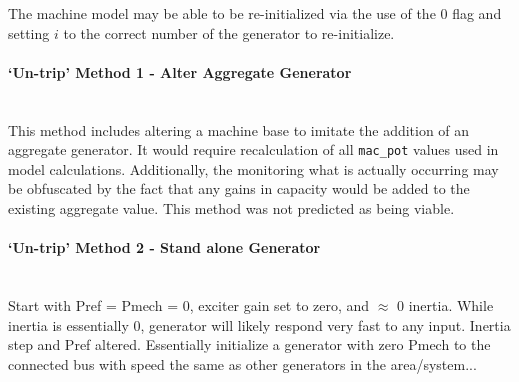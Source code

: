 \documentclass[12pt]{article}
\begin{document}
The machine model may be able to be re-initialized via the use of the 0 flag and setting $i$ to the correct number of the generator to re-initialize.

\paragraph{`Un-trip' Method 1 - Alter Aggregate Generator } \ \\
This method includes altering a machine base to imitate the addition of an aggregate generator.
It would require recalculation of all \verb|mac_pot| values used in model calculations.
Additionally, the monitoring what is actually occurring may be obfuscated by the fact that any gains in capacity would be added to the existing aggregate value.
This method was not predicted as being viable.


\paragraph{`Un-trip' Method 2 - Stand alone Generator } \ \\
Start with Pref = Pmech = 0, exciter gain set to zero, and $\approx$ 0 inertia.
While inertia is essentially 0, generator will likely respond very fast to any input.
Inertia step and Pref altered.
Essentially initialize a generator with zero Pmech to the connected bus with speed the same as other generators in the area/system...
\end{document}

